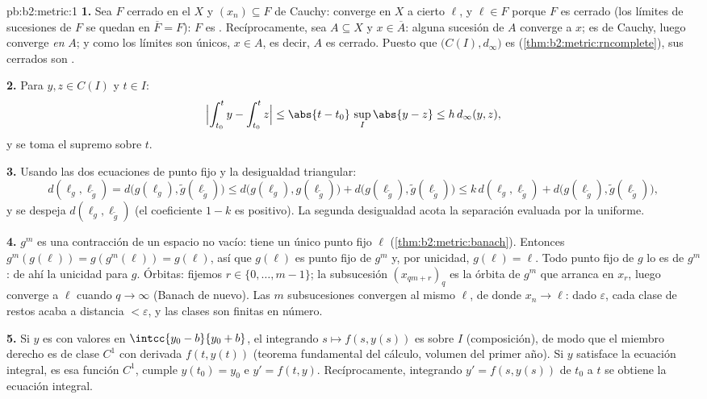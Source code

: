 \begin{solution}{pb:b2:metric:1}
\textbf{1.} Sea $F$ cerrado en el  $X$ y $(x_n) \subseteq
F$ de Cauchy: converge en $X$ a cierto $\ell$, y $\ell \in F$
porque $F$ es cerrado (los límites de sucesiones de $F$ se quedan
en $\overline F = F$): $F$ es . Recíprocamente, sea $A
\subseteq X$  y $x \in \overline A$: alguna sucesión de
$A$ converge a $x$; es de Cauchy, luego converge \emph{en} $A$; y
como los límites son únicos, $x \in A$, es decir, $A$ es cerrado.
Puesto que $\bigl(C(I), d_\infty\bigr)$ es 
(\cref{thm:b2:metric:rncomplete}), sus cerrados son .

\textbf{2.} Para $y, z \in C(I)$ y $t \in I$:
\[
\Bigl|\int_{t_0}^{t}y - \int_{t_0}^{t}z\Bigr| \leq
\abs{t - t_0}\,\sup_I\abs{y - z} \leq h\,d_\infty(y, z),
\]
y se toma el supremo sobre $t$.

\textbf{3.} Usando las dos ecuaciones de punto fijo y la
desigualdad triangular:
\[
d(\ell_g, \ell_{\widetilde g})
= d\bigl(g(\ell_g), \widetilde g(\ell_{\widetilde g})\bigr)
\leq d\bigl(g(\ell_g), g(\ell_{\widetilde g})\bigr) +
d\bigl(g(\ell_{\widetilde g}), \widetilde g(\ell_{\widetilde
g})\bigr)
\leq k\,d(\ell_g, \ell_{\widetilde g}) +
d\bigl(g(\ell_{\widetilde g}), \widetilde g(\ell_{\widetilde
g})\bigr),
\]
y se despeja $d(\ell_g, \ell_{\widetilde g})$ (el coeficiente $1 -
k$ es positivo). La segunda desigualdad acota la separación
evaluada por la uniforme.

\textbf{4.} $g^m$ es una contracción de un espacio  no
vacío: tiene un único punto fijo $\ell$
(\cref{thm:b2:metric:banach}). Entonces $g^m(g(\ell)) =
g(g^m(\ell)) = g(\ell)$, así que $g(\ell)$ es punto fijo de $g^m$
y, por unicidad, $g(\ell) = \ell$. Todo punto fijo de $g$ lo es de
$g^m$: de ahí la unicidad para $g$. Órbitas: fijemos $r \in \{0,
\dots, m-1\}$; la subsucesión $(x_{qm + r})_q$ es la órbita de
$g^m$ que arranca en $x_r$, luego converge a $\ell$ cuando $q \to
\infty$ (Banach de nuevo). Las $m$ subsucesiones convergen al
mismo $\ell$, de donde $x_n \to \ell$: dado $\varepsilon$, cada
clase de restos acaba a distancia $< \varepsilon$, y las clases
son finitas en número.

\textbf{5.} Si $y$ es  con valores en $\intcc{y_0 -
b}{y_0 + b}$, el integrando $s \mapsto f(s, y(s))$ es 
sobre $I$ (composición), de modo que el miembro derecho es de
clase $C^1$ con derivada $f(t, y(t))$ (teorema fundamental del
cálculo, volumen del primer año). Si $y$ satisface la ecuación
integral, es esa función $C^1$, cumple $y(t_0) = y_0$ e $y' = f(t,
y)$. Recíprocamente, integrando $y' = f(s, y(s))$ de $t_0$ a $t$
se obtiene la ecuación integral.


\end{solution}
